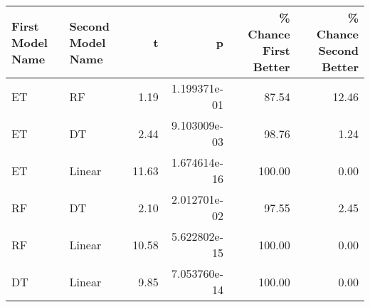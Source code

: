 \begin{tabular}{llrrrr}
\toprule
First Model Name & Second Model Name &     t &            p &  \% Chance First Better &  \% Chance Second Better \\
\midrule
              ET &                RF &  1.19 & 1.199371e-01 &                  87.54 &                   12.46 \\
              ET &                DT &  2.44 & 9.103009e-03 &                  98.76 &                    1.24 \\
              ET &            Linear & 11.63 & 1.674614e-16 &                 100.00 &                    0.00 \\
              RF &                DT &  2.10 & 2.012701e-02 &                  97.55 &                    2.45 \\
              RF &            Linear & 10.58 & 5.622802e-15 &                 100.00 &                    0.00 \\
              DT &            Linear &  9.85 & 7.053760e-14 &                 100.00 &                    0.00 \\
\bottomrule
\end{tabular}
